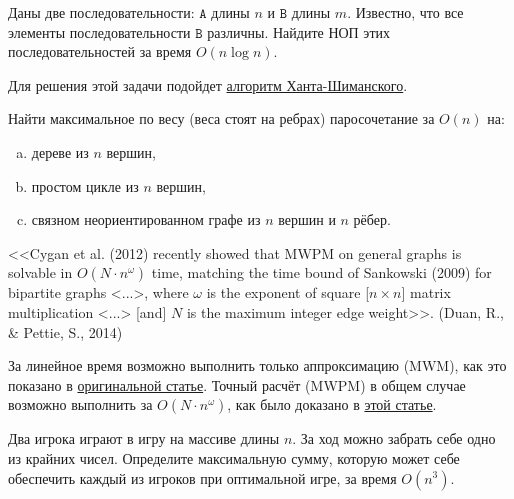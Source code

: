 
\begin{problem}
    Даны две последовательности: $\mathtt{A}$ длины $n$ и $\mathtt{B}$ длины $m$. Известно, что все элементы
    последовательности $\mathtt{B}$ различны. Найдите НОП этих последовательностей за время $O(n \log n)$.
\end{problem}

\begin{solution}
    Для решения этой задачи подойдет \href{https://dl.acm.org/doi/pdf/10.1145/359581.359603}{алгоритм Ханта-Шиманского}.
\end{solution}


\begin{problem}
    Найти максимальное по весу (веса стоят на ребрах) паросочетание за $O(n)$ на:
    \begin{enumerate}[(a)]
        \item дереве из $n$ вершин,
        \item простом цикле из $n$ вершин,
        \item связном неориентированном графе из $n$ вершин и $n$ рёбер.
    \end{enumerate}
\end{problem}

\begin{solution}
    \medskip\noindent
    \begin{displayquote}
        <<Cygan et al. (2012) recently showed that MWPM on general graphs is solvable in $O(N \cdot n^{\omega})$ time,
        matching the time bound of Sankowski (2009) for bipartite graphs <...>, where $\omega$ is the exponent of
        square [$n \times n$] matrix multiplication <...> [and] $N$ is the maximum integer edge weight>>.
        (Duan, R., \& Pettie, S., 2014)
    \end{displayquote}

    За линейное время возможно выполнить только аппроксимацию (MWM), как это показано в
    \href{https://web.eecs.umich.edu/~pettie/papers/ApproxMWM-JACM.pdf}{оригинальной статье}. Точный расчёт (MWPM) в
    общем случае возможно выполнить за $O(N \cdot n^{\omega})$, как было доказано в
    \href{https://web.eecs.umich.edu/~pettie/matching/Cygan-Gabow-Sankowski-general-mincost-matching-matrix-mult.pdf}{этой
    статье}.
\end{solution}


\begin{problem}
    Два игрока играют в игру на массиве длины $n$. За ход можно забрать себе одно из крайних чисел. Определите максимальную сумму, которую может себе обеспечить каждый из игроков при оптимальной игре, за время $O(n^3)$.
\end{problem}

